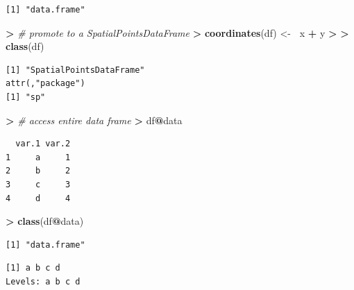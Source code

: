 \documentclass[]{krantz}
\makeatletter
\newenvironment{Shaded}{\begin{snugshade}}{\end{snugshade}}
\newcommand{\KeywordTok}[1]{\textcolor[rgb]{0.27,0.27,0.27}{\textbf{#1}}}
\newcommand{\DecValTok}[1]{\textcolor[rgb]{0.06,0.06,0.06}{#1}}
\newcommand{\StringTok}[1]{\textcolor[rgb]{0.5,0.5,0.5}{#1}}
\newcommand{\CommentTok}[1]{\textcolor[rgb]{0.37,0.37,0.37}{\textit{#1}}}
\newcommand{\OperatorTok}[1]{\textcolor[rgb]{0.43,0.43,0.43}{\textbf{#1}}}
\newcommand{\ErrorTok}[1]{\textcolor[rgb]{0.14,0.14,0.14}{\textbf{#1}}}
\newcommand{\NormalTok}[1]{#1}
\newenvironment{kframe}{%
\medskip{}
\setlength{\fboxsep}{.8em}
 \def\at@end@of@kframe{}%
 \ifinner\ifhmode%
  \def\at@end@of@kframe{\end{minipage}}%
  \begin{minipage}{\columnwidth}%
 \fi\fi%
 \def\FrameCommand##1{\hskip\@totalleftmargin \hskip-\fboxsep
 \colorbox{shadecolor}{##1}\hskip-\fboxsep
     \hskip-\linewidth \hskip-\@totalleftmargin \hskip\columnwidth}%
 \MakeFramed {\advance\hsize-\width
   \@totalleftmargin\z@ \linewidth\hsize
   \@setminipage}}%
 {\par\unskip\endMakeFramed%
 \at@end@of@kframe}
\renewenvironment{Shaded}{\begin{kframe}}{\end{kframe}}
\theoremstyle{definition}
\theoremstyle{definition}
\theoremstyle{definition}
\theoremstyle{remark}
\makeatother
\begin{document}
\begin{verbatim}
[1] "data.frame"
\end{verbatim}

\begin{Shaded}
\begin{Highlighting}[]
\OperatorTok{>}\StringTok{ }\CommentTok{# promote to a SpatialPointsDataFrame}
\ErrorTok{>}\StringTok{ }\KeywordTok{coordinates}\NormalTok{(df) <-}\StringTok{ }\ErrorTok{~}\NormalTok{x }\OperatorTok{+}\StringTok{ }\NormalTok{y}
\OperatorTok{>}\StringTok{ }
\ErrorTok{>}\StringTok{ }\KeywordTok{class}\NormalTok{(df)}
\end{Highlighting}
\end{Shaded}

\begin{verbatim}
[1] "SpatialPointsDataFrame"
attr(,"package")
[1] "sp"
\end{verbatim}

\begin{Shaded}
\begin{Highlighting}[]
\OperatorTok{>}\StringTok{ }\CommentTok{# access entire data frame}
\ErrorTok{>}\StringTok{ }\NormalTok{df}\OperatorTok{@}\NormalTok{data}
\end{Highlighting}
\end{Shaded}

\begin{verbatim}
  var.1 var.2
1     a     1
2     b     2
3     c     3
4     d     4
\end{verbatim}

\begin{Shaded}
\begin{Highlighting}[]
\OperatorTok{>}\StringTok{ }\KeywordTok{class}\NormalTok{(df}\OperatorTok{@}\NormalTok{data)}
\end{Highlighting}
\end{Shaded}

\begin{verbatim}
[1] "data.frame"
\end{verbatim}

\begin{Shaded}
\end{Shaded}

\begin{verbatim}
[1] a b c d
Levels: a b c d
\end{verbatim}
\end{document}
